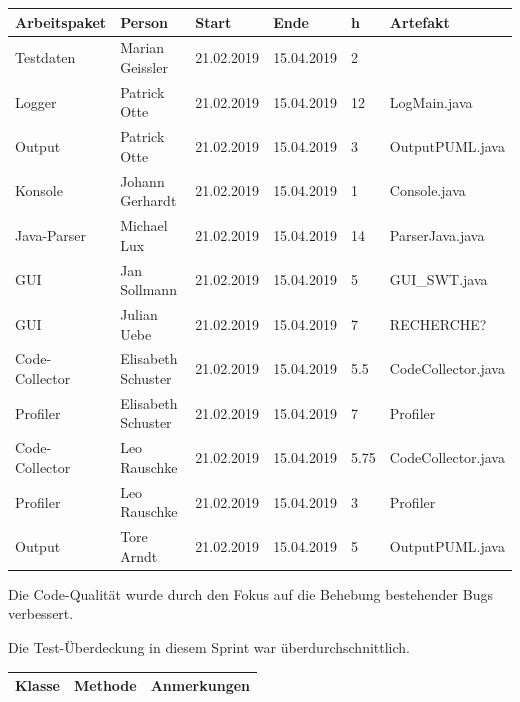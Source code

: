 \begin{longtable}{|p{4cm}|l|l|l|l|l|}
        \hline
        Arbeitspaket & Person & Start & Ende & h & Artefakt\\
        \hline
        Testdaten & Marian Geissler   & 21.02.2019 & 15.04.2019 & 2 &  \\ \hline
        Logger & Patrick Otte   & 21.02.2019 & 15.04.2019 & 12 & LogMain.java \\ \hline
        Output & Patrick Otte   & 21.02.2019 & 15.04.2019 & 3 & OutputPUML.java \\ \hline
        Konsole & Johann Gerhardt   & 21.02.2019 & 15.04.2019 & 1 & Console.java \\ \hline
        Java-Parser & Michael Lux   & 21.02.2019 & 15.04.2019 & 14 & ParserJava.java\\ \hline
        GUI & Jan Sollmann  & 21.02.2019 & 15.04.2019 & 5 & GUI\_SWT.java \\ \hline
        GUI & Julian Uebe  & 21.02.2019 & 15.04.2019 & 7 & RECHERCHE? \\ \hline
        Code-Collector & Elisabeth Schuster  & 21.02.2019 & 15.04.2019 & 5.5  & CodeCollector.java \\ \hline
        Profiler & Elisabeth Schuster  & 21.02.2019 & 15.04.2019 & 7  & Profiler \\ \hline
        Code-Collector & Leo Rauschke  & 21.02.2019 & 15.04.2019 & 5.75 & CodeCollector.java \\ \hline
        Profiler & Leo Rauschke  & 21.02.2019 & 15.04.2019 & 3 & Profiler\\ \hline
        Output & Tore Arndt  & 21.02.2019 & 15.04.2019 & 5 & OutputPUML.java\\ \hline
        
        
\end{longtable}     
\nsecend

Die Code-Qualität wurde durch den Fokus auf die Behebung bestehender Bugs verbessert.
\nsecend%

Die Test-Überdeckung in diesem Sprint war überdurchschnittlich.
\nsecend%

\begin{table}[H]

\begin{tabularx}{\textwidth}{ |l|l|X| }
\hline
\textbf{Klasse} & \textbf{Methode} & \textbf{Anmerkungen}\\
 \hline
\hline
\end{tabularx}
\end{table}

